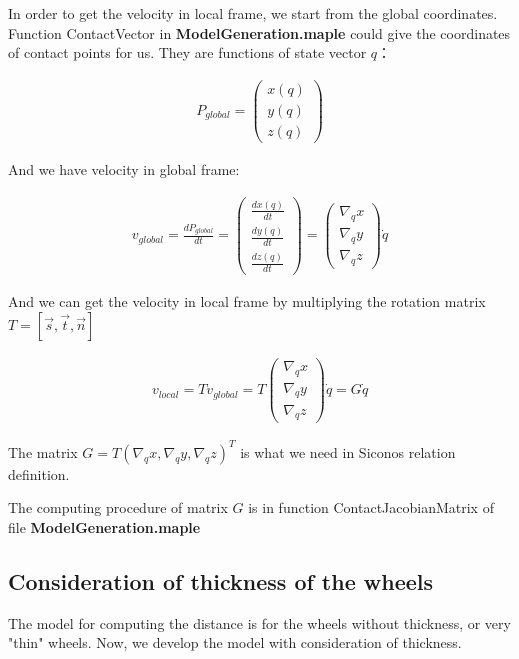 In order to get the velocity in local frame, we start from the global coordinates. Function ContactVector in \textbf{ModelGeneration.maple} could give the coordinates of contact points for us. They are functions of state vector $q$： 

\begin{eqnarray}
P_{global}=\begin{pmatrix}
x(q)\\
y(q)\\
z(q)
\end{pmatrix}
\end{eqnarray}

And we have velocity in global frame:

\begin{eqnarray}
v_{global}=\frac{dP_{global}}{dt}=
\begin{pmatrix}
\frac{dx(q)}{dt}\\
\frac{dy(q)}{dt}\\
\frac{dz(q)}{dt}
\end{pmatrix}=
\begin{pmatrix}
\nabla_{q}x\\
\nabla_{q}y\\
\nabla_{q}z
\end{pmatrix}\dot{q}
\end{eqnarray}

And we can get the velocity in local frame by multiplying the rotation matrix $T=[\vec{s},\vec{t},\vec{n}]$

\begin{eqnarray}
v_{local}=Tv_{global}=T\begin{pmatrix}
\nabla_{q}x\\
\nabla_{q}y\\
\nabla_{q}z
\end{pmatrix}\dot{q}=G\dot{q}
\end{eqnarray}

The matrix $G=T(\nabla_{q}x,\nabla_{q}y,\nabla_{q}z)^T$ is what we need in Siconos relation definition.

The computing procedure of matrix $G$ is in function ContactJacobianMatrix of file \textbf{ModelGeneration.maple}


\subsection{Consideration of thickness of the wheels}

The model for computing the distance is for the wheels without thickness, or very "thin" wheels. Now, we develop the model with consideration of thickness. \\



